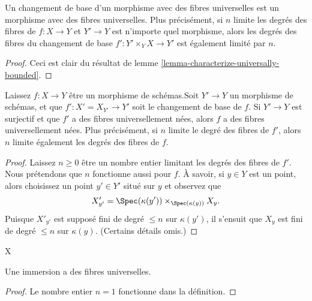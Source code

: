 \begin{lemma}

\label{lemma-base-change-universally-bounded}
Un changement de base d'un morphisme avec des fibres universelles est un morphisme avec des fibres universelles. Plus précisément, si $n$ limite les degrés des fibres de $f : X \to Y$ et $Y' \to Y$ est n'importe quel morphisme, alors les degrés des fibres du changement de base $f' : Y' \times_Y X \to Y'$ est également limité par $n$.
\end{lemma}

\begin{proof}
Ceci est clair du résultat de lemme \ref{lemma-characterize-universally-bounded}.
\end{proof}

\begin{lemma}

\label{lemma-descent-universally-bounded}
Laissez $f : X \to Y$ être un morphisme de schémas.Soit $Y' \to Y$ un morphisme de schémas, et que $f' : X' = X_{Y'} \to Y'$ soit le changement de base de $f$. Si $Y' \to Y$ est surjectif et que $f'$ a des fibres universellement nées, alors $f$ a des fibres universellement nées. Plus précisément, si $n$ limite le degré des fibres de $f'$, alors $n$ limite également les degrés des fibres de $f$.
\end{lemma}

\begin{proof}
Laissez $n \geq 0$ être un nombre entier limitant les degrés des fibres de $f'$. Nous prétendons que $n$ fonctionne aussi pour $f$. À savoir, si $y \in Y$ est un point, alors choisissez un point $y' \in Y'$ situé sur $y$ et observez que $$
X'_{y'} = \Spec(\kappa(y')) \times_{\Spec(\kappa(y))} X_y.
$$ Puisque $X'_{y'}$ est supposé fini de degré $\leq n$ sur $\kappa(y')$, il s'ensuit que $X_y$ est fini de degré $\leq n$ sur $\kappa(y)$. (Certains détails omis.)
\end{proof}
X

\begin{lemma}

\label{lemma-immersion-universally-bounded}

Une immersion a des fibres universelles.

\end{lemma}

\begin{proof}

Le nombre entier $n = 1$ fonctionne dans la définition.

\end{proof}

